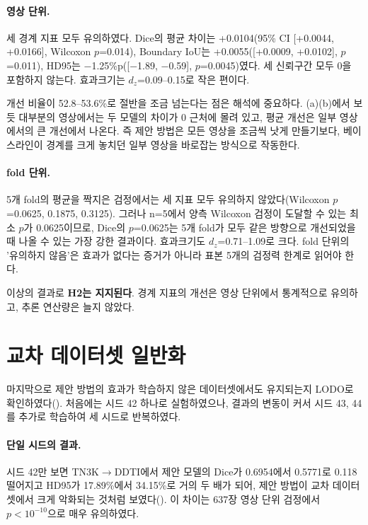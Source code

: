 \paragraph{영상 단위.} 세 경계 지표 모두 유의하였다. Dice의 평균 차이는 +0.0104(95\% CI [+0.0044, +0.0166],
Wilcoxon $p$=0.014), Boundary IoU는 +0.0055([+0.0009, +0.0102], $p$=0.011), HD95는 $-$1.25\%p([$-$1.89, $-$0.59],
$p$=0.0045)였다. 세 신뢰구간 모두 0을 포함하지 않는다. 효과크기는 $d_z$=0.09--0.15로 작은 편이다.

개선 비율이 52.8--53.6\%로 절반을 조금 넘는다는 점은 해석에 중요하다. (a)(b)에서 보듯
대부분의 영상에서는 두 모델의 차이가 0 근처에 몰려 있고, 평균 개선은 일부 영상에서의 큰 개선에서 나온다.
즉 제안 방법은 모든 영상을 조금씩 낫게 만들기보다, 베이스라인이 경계를 크게 놓치던 일부 영상을 바로잡는 방식으로
작동한다.

\paragraph{fold 단위.} 5개 fold의 평균을 짝지은 검정에서는 세 지표 모두 유의하지 않았다(Wilcoxon $p$=0.0625,
0.1875, 0.3125). 그러나 n=5에서 양측 Wilcoxon 검정이 도달할 수 있는 최소 $p$가 0.0625이므로, Dice의 $p$=0.0625는
5개 fold가 모두 같은 방향으로 개선되었을 때 나올 수 있는 가장 강한 결과이다. 효과크기도 $d_z$=0.71--1.09로 크다.
fold 단위의 '유의하지 않음'은 효과가 없다는 증거가 아니라 표본 5개의 검정력 한계로 읽어야 한다.

이상의 결과로 \textbf{H2는 지지된다}. 경계 지표의 개선은 영상 단위에서 통계적으로 유의하고, 추론 연산량은
늘지 않았다.

\section{교차 데이터셋 일반화}\label{sec:exp_lodo}

마지막으로 제안 방법의 효과가 학습하지 않은 데이터셋에서도 유지되는지 LODO로 확인하였다().
처음에는 시드 42 하나로 실험하였으나, 결과의 변동이 커서 시드 43, 44를 추가로 학습하여 세 시드로 반복하였다.



\paragraph{단일 시드의 결과.} 시드 42만 보면 TN3K$\rightarrow$DDTI에서 제안 모델의 Dice가 0.6954에서 0.5771로
0.118 떨어지고 HD95가 17.89\%에서 34.15\%로 거의 두 배가 되어, 제안 방법이 교차 데이터셋에서 크게 악화되는
것처럼 보였다(). 이 차이는 637장 영상 단위 검정에서 $p<10^{-10}$으로 매우 유의하였다.

